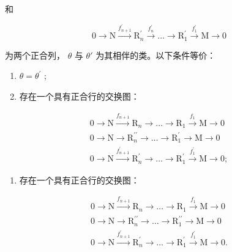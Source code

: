 和

\[
0 \rightarrow \mathrm{N} \xrightarrow {f _ {n + 1} ^ {\prime}} \mathrm{R} _ {n} ^ {\prime} \xrightarrow {f _ {n} ^ {\prime}} \dots \rightarrow \mathrm{R} _ {1} ^ {\prime} \xrightarrow {f _ {1} ^ {\prime}} \mathrm{M} \rightarrow 0
\]

为两个正合列， \(\theta\) 与 \(\theta'\) 为其相伴的类。以下条件等价：

\begin{enumerate}
\def\labelenumi{(\roman{enumi})}
\item
  \(\theta = \theta^{\prime}\) ;
\item
  存在一个具有正合行的交换图：
\end{enumerate}

\[
\begin{array}{c} 0 \longrightarrow \mathrm{N} \xrightarrow {f _ {n + 1}} \mathrm{R} _ {n} \longrightarrow \dots \longrightarrow \mathrm{R} _ {1} \xrightarrow {f _ {1}} \mathrm{M} \longrightarrow 0 \\ 0 \longrightarrow \mathrm{N} \longrightarrow \mathrm{R} _ {n} ^ {\prime \prime} \longrightarrow \dots \longrightarrow \mathrm{R} _ {1} ^ {\prime} \longrightarrow \mathrm{M} \longrightarrow 0 \\ 0 \longrightarrow \mathrm{N} \xrightarrow {f _ {n + 1} ^ {\prime}} \mathrm{R} _ {n} ^ {\prime} \longrightarrow \dots \longrightarrow \mathrm{R} _ {1} ^ {\prime} \xrightarrow {f _ {1} ^ {\prime}} \mathrm{M} \longrightarrow 0; \end{array}
\]

\begin{enumerate}
\def\labelenumi{(\roman{enumi})}
\setcounter{enumi}{2}
\tightlist
\item
  存在一个具有正合行的交换图：
\end{enumerate}

\[
\begin{array}{c} 0 \longrightarrow \mathrm{N} \xrightarrow {f _ {n + 1}} \mathrm{R} _ {n} \longrightarrow \dots \longrightarrow \mathrm{R} _ {1} \xrightarrow {f _ {1}} \mathrm{M} \longrightarrow 0 \\ 0 \longrightarrow \mathrm{N} \longrightarrow \mathrm{R} _ {n} ^ {\prime \prime} \longrightarrow \dots \longrightarrow \mathrm{R} _ {1} ^ {\prime \prime} \longrightarrow \mathrm{M} \longrightarrow 0 \\ 0 \longrightarrow \mathrm{N} \xrightarrow {f _ {n + 1} ^ {\prime}} \mathrm{R} _ {n} ^ {\prime} \longrightarrow \dots \longrightarrow \mathrm{R} _ {1} ^ {\prime} \xrightarrow {f _ {1} ^ {\prime}} \mathrm{M} \longrightarrow 0. \end{array}
\]

